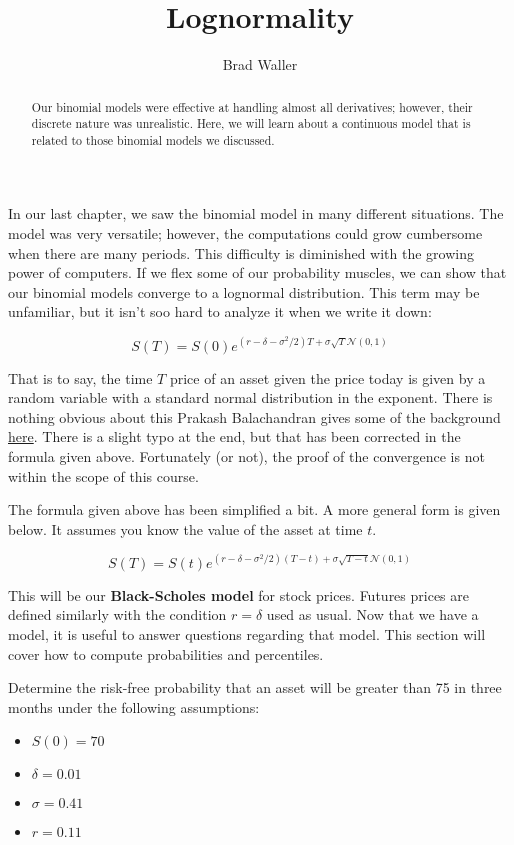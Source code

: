 \documentclass{ximera}
\author{Brad Waller}
\title{Lognormality}
\begin{document}
\begin{abstract}
Our binomial models were effective at handling almost all derivatives; however, their discrete nature was unrealistic. Here, we will learn about a continuous model that is related to those binomial models we discussed.
\end{abstract}

\maketitle

In our last chapter, we saw the binomial model in many different situations. The model was very versatile; however, the computations could grow cumbersome when there are many periods. This difficulty is diminished with the growing power of computers. If we flex some of our probability muscles, we can show that our binomial models converge to a lognormal distribution. This term may be unfamiliar, but it isn't soo hard to analyze it when we write it down:

\begin{equation*}
S(T)=S(0)e^{(r-\delta-\sigma^2/2)T+\sigma\sqrt{T}\mathcal{N}(0,1)}
\end{equation*}

That is to say, the time $T$ price of an asset given the price today is given by a random variable with a standard normal distribution in the exponent. There is nothing obvious about this Prakash Balachandran gives some of the background \href{http://math.bu.edu/people/prakashb/Math/arliegeobm.pdf}{here}. There is a slight typo at the end, but that has been corrected in the formula given above. Fortunately (or not), the proof of the convergence is not within the scope of this course.

The formula given above has been simplified a bit. A more general form is given below. It assumes you know the value of the asset at time $t$.

\begin{equation*}
S(T)=S(t)e^{(r-\delta-\sigma^2/2)(T-t)+\sigma\sqrt{T-t}\mathcal{N}(0,1)}
\end{equation*}

This will be our {\bf Black-Scholes model} for stock prices. Futures prices are defined similarly with the condition $r=\delta$ used as usual.  Now that we have a model, it is useful to answer questions regarding that model. This section will cover how to compute probabilities and percentiles.

\begin{example}
Determine the risk-free probability that an asset will be greater than 75 in three months under the following assumptions:
	\begin{itemize}
	\item $S(0)=70$
	\item $\delta=0.01$
	\item $\sigma=0.41$
	\item $r=0.11$
	\end{itemize}
\end{example}
\end{document}

